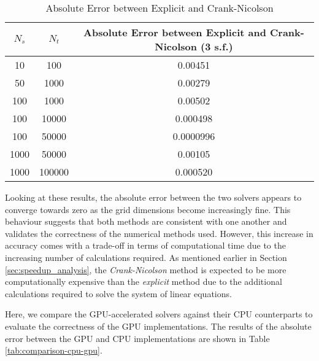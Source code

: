 \begin{table}[H]
    \centering
    \begin{tabular}
        { |c|c|c| }
        \hline
        \textbf{$N_s$} & \textbf{$N_t$} & \textbf{Absolute Error between Explicit and Crank-Nicolson (3 s.f.)} \\ \hline
            10 & 100 & 0.00451 \\ \hline
            50 & 1000 & 0.00279 \\ \hline
            100 & 1000 & 0.00502 \\ \hline
            100 & 10000 & 0.000498 \\ \hline
            100 & 50000 & 0.0000996 \\ \hline
            1000 & 50000 & 0.00105 \\ \hline
            1000 & 100000 & 0.000520 \\ \hline
    \end{tabular}
    \caption{Absolute Error between Explicit and Crank-Nicolson}
    \label{tab:comparison-explicit-cn}
\end{table}

Looking at these results, the absolute error between the two solvers appears to converge towards zero as the grid dimensions become increasingly fine. This behaviour suggests that both methods are consistent with one another and validates the correctness of the numerical methods used. However, this increase in accuracy comes with a trade-off in terms of computational time due to the increasing number of calculations required. As mentioned earlier in Section \ref{sec:speedup_analysis}, the \textit{Crank-Nicolson} method is expected to be more computationally expensive than the \textit{explicit} method due to the additional calculations required to solve the system of linear equations. 

Here, we compare the GPU-accelerated solvers against their CPU counterparts to evaluate the correctness of the GPU implementations. The results of the absolute error between the GPU and CPU implementations are shown in Table \ref{tab:comparison-cpu-gpu}.

